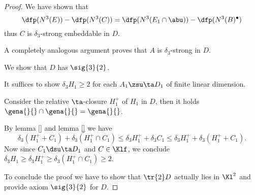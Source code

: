 \begin{proof}
We have shown that
$$\dfp(N^{3}(E))-\dfp(N^{3}(C))=\dfp(N^{3}(E_{1}\cap\abu))-\dfp(N^{3}(B)^{\bullet})$$
thus $C$ is $\delta_{3}$-strong embeddable in $D$.

A completely analogous argument proves that $A$ is $\delta_{3}$-strong in $D$.

\smallskip
We show that $D$ has $\sig{3}{2}$.

It suffices to show $\delta_{3}H_{1}\geq2$ for each  $A_{1}\zsu\ta D_{1}$ of finite linear dimension. 

Consider the relative $\ta$-closure $H_{1}^{+}$ of $H_{1}$ in $D$, then it holds
$\gena{}{}\cap\gena{}{}=\gena{}{}$.

By lemma \ref{} and lemma \ref{} we have
$$
\delta_{3}(H_{1}^{+}+C_{1})+\delta_{3}(H_{1}^{+}\cap C_{1})
\leq\delta_{3}H_{1}^{+}+\delta_{3}C_{1}\leq\delta_{3}H_{1}^{+}+\delta_{3}(H_{1}^{+}+C_{1}).
$$
Now since $C_{1}\dsu\ta D_{1}$ and $C\in\Klf$, we conclude
$\delta_{3}H_{1}\geq\delta_{3}H_{1}^{+}\geq\delta_{3}(H_{1}^{+}\cap C_{1})\geq2$.


To conclude the proof we have to
show that $\tr{2}D$ actually lies in $\Kl^{2}$ and provide axiom $\sig{3}{2}$ for $D$.
\end{proof}
